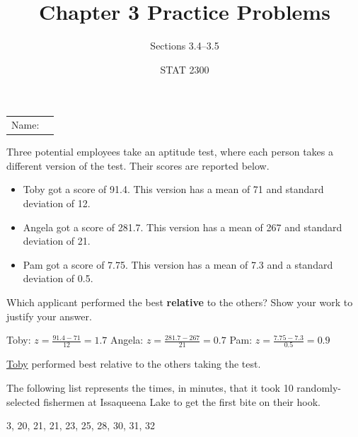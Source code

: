 \documentclass[noanswers]{exam}
\title{Chapter 3 Practice Problems}
\author{Sections 3.4--3.5}
\date{STAT 2300}
\begin{document}
\noindent\begin{tabular}{@{}p{.3in}p{3in}@{}}
Name: & \hrulefill
\end{tabular}

\vspace{3mm}

\begin{questions} 
	
	\question Three potential employees take an aptitude test, where each person takes a different version of the test. Their scores are reported below.
	\begin{itemize}
		\item Toby got a score of 91.4. This version has a mean of 71 and standard deviation of 12.
		\item Angela got a score of 281.7. This version has a mean of 267 and standard deviation of 21.
		\item Pam got a score of 7.75. This version has a mean of 7.3 and a standard deviation of 0.5.
	
	\end{itemize}
	
	Which applicant performed the best \textbf{relative} to the others? Show your work to justify your answer. 
	
	\begin{solution}[\stretch{1}]
	
			\vspace{3mm}
			
			Toby: $z=\frac{91.4-71}{12}=1.7$ \hspace{12mm} Angela: $z=\frac{281.7-267}{21}=0.7$ \hspace{12mm} Pam: $z=\frac{7.75-7.3}{0.5}=0.9$
			
			\vspace{3mm}
		
			\underline{Toby} performed best relative to the others taking the test.			
			
			\vspace{3mm}
		\end{solution}
	
	\question The following list represents the times, in minutes, that it took 10 randomly-selected fishermen at Issaqueena Lake to get the first bite on their hook.
\begin{center}
    3, 20, 21, 21, 23, 25, 28, 30, 31, 32
\end{center}
	
	\vspace{3mm}
	

\end{questions}
\end{document}
